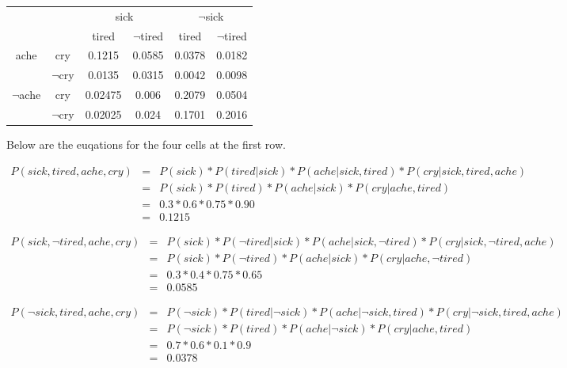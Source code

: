 \documentclass{article}%
\begin{document}
\begin{enumerate}
	\begin{table}[h]
	\centering
	\begin{tabular}{|c|c|c|c|c|c|}
	\hline
	\multicolumn{2}{|c|}{}&\multicolumn{2}{c|}{sick}&\multicolumn{2}{c|}{$\neg$sick} \\ \cline{3-6}
	\multicolumn{2}{|c|}{}&tired&$\neg$tired&tired&$\neg$tired \\ \hline
	ache&cry& 0.1215& 0.0585& 0.0378 & 0.0182\\ \cline{2-6}
	&$\neg$cry& 0.0135&0.0315 &0.0042 & 0.0098\\ \hline
	$\neg$ache&cry& 0.02475 &0.006 & 0.2079& 0.0504\\ \cline{2-6}
	&$\neg$cry& 0.02025&0.024 &0.1701 & 0.2016\\ \hline
	\end{tabular}
	\end{table}
	
	Below are the euqations for the four cells at the first row.
	
	\[
	 \begin{array}{lcl} P(sick, tired, ache, cry)& = &P(sick) * P(tired | sick) * P(ache | sick, tired) * P(cry| sick,tired,ache) \\
 	 						   &=&P(sick) * P(tired) * P(ache|sick) * P(cry|ache,tired) \\
 	 						   &=&0.3*0.6 *0.75*0.90\\
 	 						   &=&0.1215 
 	 \end{array}	 
 	 \]
 	 
 	 \[
	 \begin{array}{lcl} P(sick, \neg tired, ache, cry)& = &P(sick) * P(\neg tired | sick) * P(ache | sick, \neg tired) * P(cry| sick,\neg tired,ache) \\
 	 						   &=&P(sick) * P(\neg tired) * P(ache|sick) * P(cry|ache,\neg tired) \\
 	 						   &=&0.3*0.4 *0.75*0.65\\
 	 						   &=&0.0585
 	 \end{array}	 
 	 \]
 	 
 	 
	\[
	 \begin{array}{lcl} P(\neg sick, tired, ache, cry)& = &P(\neg sick) * P(tired | \neg sick) * P(ache | \neg sick, tired) * P(cry| \neg sick,tired,ache) \\
 	 						   &=&P(\neg sick) * P(tired) * P(ache|\neg sick) * P(cry|ache,tired) \\
 	 						   &=&0.7*0.6 *0.1*0.9\\
 	 						   &=&0.0378 
 	 \end{array}	 
 	 \]
 	 

\end{enumerate}
\end{document}
